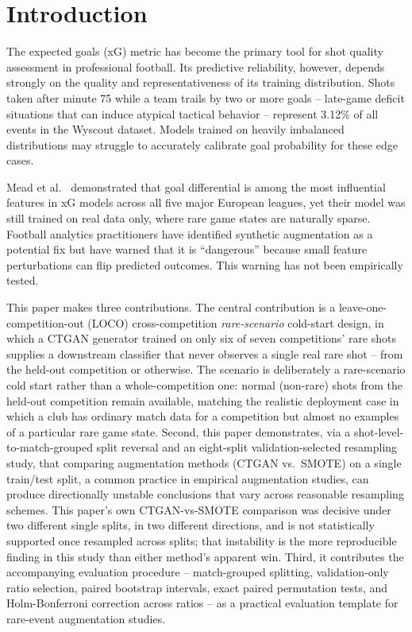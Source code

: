 \documentclass[conference,a4paper]{IEEEtran}
\begin{document}
\section{Introduction}
The expected goals (xG) metric has become the primary tool for shot quality assessment in professional football. Its predictive reliability, however, depends strongly on the quality and representativeness of its training distribution. Shots taken after minute 75 while a team trails by two or more goals -- late-game deficit situations that can induce atypical tactical behavior -- represent 3.12\% of all events in the Wyscout dataset. Models trained on heavily imbalanced distributions may struggle to accurately calibrate goal probability for these edge cases.

Mead et al.~\cite{mead2023expected} demonstrated that goal differential is among the most influential features in xG models across all five major European leagues, yet their model was still trained on real data only, where rare game states are naturally sparse. Football analytics practitioners have identified synthetic augmentation as a potential fix but have warned that it is ``dangerous'' because small feature perturbations can flip predicted outcomes. This warning has not been empirically tested.

This paper makes three contributions. The central contribution is a leave-one-competition-out (LOCO) cross-competition \emph{rare-scenario} cold-start design, in which a CTGAN generator trained on only six of seven competitions' rare shots supplies a downstream classifier that never observes a single real rare shot -- from the held-out competition or otherwise. The scenario is deliberately a rare-scenario cold start rather than a whole-competition one: normal (non-rare) shots from the held-out competition remain available, matching the realistic deployment case in which a club has ordinary match data for a competition but almost no examples of a particular rare game state. Second, this paper demonstrates, via a shot-level-to-match-grouped split reversal and an eight-split validation-selected resampling study, that comparing augmentation methods (CTGAN vs.\ SMOTE) on a single train/test split, a common practice in empirical augmentation studies, can produce directionally unstable conclusions that vary across reasonable resampling schemes. This paper's own CTGAN-vs-SMOTE comparison was decisive under two different single splits, in two different directions, and is not statistically supported once resampled across splits; that instability is the more reproducible finding in this study than either method's apparent win. Third, it contributes the accompanying evaluation procedure -- match-grouped splitting, validation-only ratio selection, paired bootstrap intervals, exact paired permutation tests, and Holm-Bonferroni correction across ratios -- as a practical evaluation template for rare-event augmentation studies.
\end{document}
